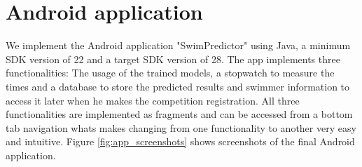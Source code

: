 \section{Android application}\label{sec:app_plans}
We implement the Android application "SwimPredictor" using Java, a minimum SDK version of 22 and a target SDK version of 28. The app implements three functionalities: The usage of the trained models, a stopwatch to measure the times and a database to store the predicted results and swimmer information to access it later when he makes the competition registration. All three functionalities are implemented as fragments and can be accessed from a bottom tab navigation whats makes changing from one functionality to another very easy and intuitive. Figure \ref{fig:app_screenshots} shows screenshots of the final Android application.\\
